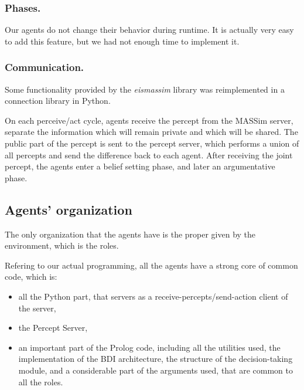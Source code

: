 \documentclass{llncs2e/llncs}
\begin{document}
\subsubsection{Phases.}

    Our agents do not change their behavior during runtime. It is actually very 
    easy to add this feature, but we had not enough time to implement it.
    

\subsubsection{Communication.}

    Some functionality provided by the \textit{eismassim} library was
    reimplemented in a connection library in Python.

    On each perceive/act cycle, agents receive the percept from the MASSim server, 
    separate the information which will remain private and which will be shared. 
    The public part of the percept is sent to the percept server, which performs a 
    union of all percepts and send the difference back to each agent. After 
    receiving the joint percept, the agents enter a belief setting phase, and 
    later an argumentative phase.
    
\subsection{Agents' organization}

    The only organization that the agents have is the proper given by the 
    environment, which is the roles. 
    
    Refering to our actual programming, all the agents have a strong core of common
    code, which is:
    
    \begin{itemize}
        \item all the Python part, that servers as a receive-percepts/send-action client 
        of the server,
        
        \item the Percept Server,
        
        \item an important part of the Prolog code, including all the utilities used, the
        implementation of the BDI architecture, the structure of the 
        decision-taking module, and a considerable part of the arguments used, that
        are common to all the roles.
    \end{itemize}
    
\end{document}
